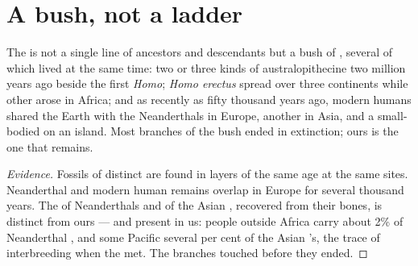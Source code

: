 \section{A bush, not a ladder}

\begin{proposition}\label{prop:g12:human-evolution:bush}
The  is not a single line of ancestors and descendants
but a bush of , several of which lived at the same time: two or
three kinds of australopithecine two million years ago beside the first
\emph{Homo}; \emph{Homo erectus} spread over three continents while
other  arose in Africa; and as recently as fifty thousand years
ago, modern humans shared the Earth with the Neanderthals in Europe,
another  in Asia, and a small-bodied  on an island.
Most branches of the bush ended in extinction; ours is the one that
remains.
\end{proposition}
\begin{proof}[Evidence]
Fossils of distinct  are found in layers of the same age at the
same sites. Neanderthal and modern human remains overlap in Europe for
several thousand years. The  of Neanderthals and of the Asian
, recovered from their bones, is distinct from ours --- and
present in us: people outside Africa carry about 2\% of Neanderthal ,
and some Pacific  several per cent of the Asian
's, the trace of interbreeding when the  met. The
branches touched before they ended.
\end{proof}


